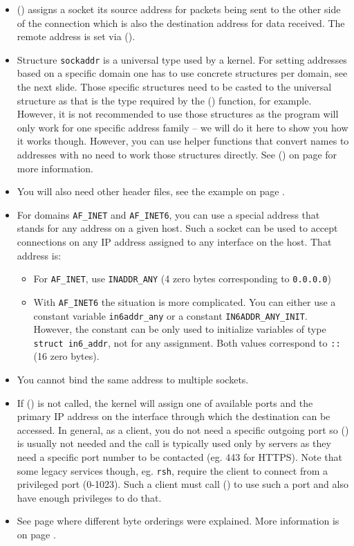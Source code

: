 \begin{itemize}
\item {}() assigns a socket its source address for packets being sent
to the other side of the connection which is also the destination address for
data received.  The remote address is set via ().

\item Structure \texttt{sockaddr} is a universal type used by a kernel.  For
setting addresses based on a specific domain one has to use concrete structures
per domain, see the next slide.  Those specific structures need to be casted to
the universal structure as that is the type required by the ()
function, for example.  However, it is not recommended to use those structures
as the program will only work for one specific address family -- we will do it
here to show you how it works though.  However, you can use helper functions
that convert names to addresses with no need to work those structures directly.
See () on page \pageref{GETADDRINF} for more information.
\item You will also need other header files, see the example on page
\pageref{BIND_EXAMPLE}.
\item For domains \texttt{AF\_INET} and \texttt{AF\_INET6}, you can use a
special address that stands for any address on a given host.  Such a socket can
be used to accept connections on any IP address assigned to any interface on the
host.  That address is:
\begin{itemize}
\item For \texttt{AF\_INET}, use \texttt{INADDR\_ANY} (4 zero
bytes corresponding to \texttt{0.0.0.0})
\item With \texttt{AF\_INET6} the situation is more complicated.  You can either
use a constant variable \texttt{in6addr\_any} or a constant
\texttt{IN6ADDR\_ANY\_INIT}.  How\-ever, the constant can be only used to
initialize variables of type \texttt{struct in6\_addr}, not for any assignment.
Both values correspond to \texttt{::} (16 zero bytes).
\end{itemize}
\item You cannot bind the same address to multiple sockets.

\item If () is not called, the kernel will assign one of available
ports and the primary IP address on the interface through which the destination
can be accessed.  In general, as a client, you do not need a specific outgoing
port so () is usually not needed and the call is typically used only
by servers as they need a specific port number to be contacted (eg. 443 for
HTTPS).  Note that some legacy services though, eg. \texttt{rsh}, require the
client to connect from a privileged port (0-1023).  Such a client must call
() to use such a port and also have enough privileges to do that.
\item {} See
page \pageref{BYTE_ORDERING} where different byte orderings were explained.
More information is on page \pageref{HTON}.
\end{itemize}

